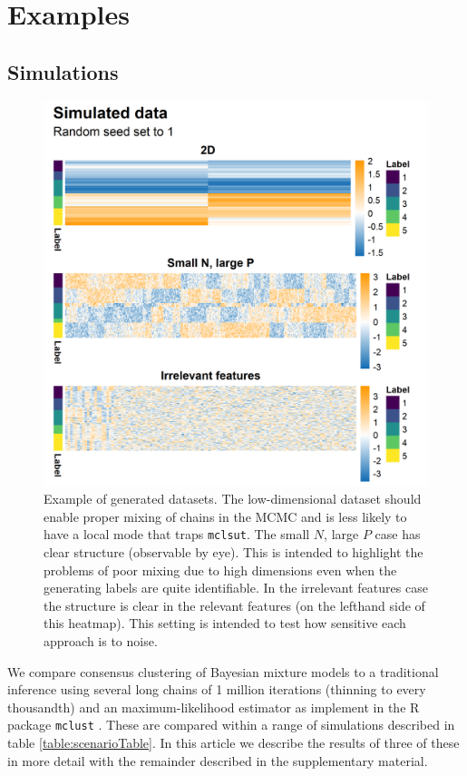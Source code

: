 \documentclass{bioinfo}
\begin{document}
\section{Examples}
\subsection{Simulations}

\begin{figure}
	\centering
	\includegraphics[scale=0.6]{./Images/Simulations/Data.png}
	\caption{Example of generated datasets. The low-dimensional dataset should enable proper mixing of chains in the MCMC and is less likely to have a local mode that traps \texttt{mclsut}. The small $N$, large $P$ case has clear structure (observable by eye). This is intended to highlight the problems of poor mixing due to high dimensions even when the generating labels are quite identifiable. In the irrelevant features case the structure is clear in the relevant features (on the lefthand side of this heatmap). This setting is intended to test how sensitive each approach is to noise.}
	\label{fig:genData}
\end{figure}

We compare consensus clustering of Bayesian mixture models to a traditional inference using several long chains of 1 million iterations (thinning to every thousandth) and an maximum-likelihood estimator as implement in the R package \texttt{mclust} \citep{mclust2016scrucca}. These are compared within a range of simulations described in table \ref{table:scenarioTable}. In this article we describe the results of three of these in more detail with the remainder described in the supplementary material.
\end{document}
